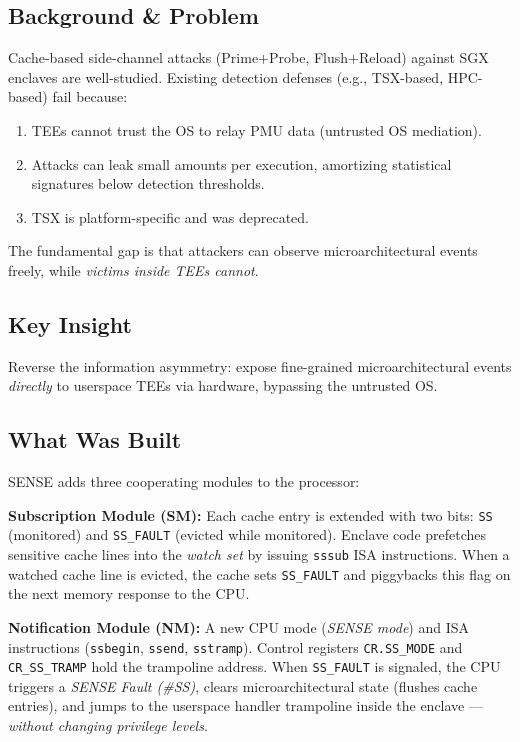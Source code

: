 \documentclass[11pt,letterpaper]{article}
\begin{document}
\subsection*{Background \& Problem}
Cache-based side-channel attacks (Prime+Probe, Flush+Reload) against SGX enclaves are well-studied.
Existing detection defenses (e.g., TSX-based, HPC-based) fail because:
\begin{enumerate}
    \item TEEs cannot trust the OS to relay PMU data (untrusted OS mediation).
    \item Attacks can leak small amounts per execution, amortizing statistical signatures below detection thresholds.
    \item TSX is platform-specific and was deprecated.
\end{enumerate}
The fundamental gap is that attackers can observe microarchitectural events freely, while \emph{victims inside TEEs cannot}.

\subsection*{Key Insight}
Reverse the information asymmetry: expose fine-grained microarchitectural events \emph{directly} to userspace TEEs via hardware, bypassing the untrusted OS.

\subsection*{What Was Built}
SENSE adds three cooperating modules to the processor:

\textbf{Subscription Module (SM):}
Each cache entry is extended with two bits: \texttt{SS} (monitored) and \texttt{SS\_FAULT} (evicted while monitored).
Enclave code prefetches sensitive cache lines into the \emph{watch set} by issuing \texttt{sssub} ISA instructions.
When a watched cache line is evicted, the cache sets \texttt{SS\_FAULT} and piggybacks this flag on the next memory response to the CPU.

\textbf{Notification Module (NM):}
A new CPU mode (\emph{SENSE mode}) and ISA instructions (\texttt{ssbegin}, \texttt{ssend}, \texttt{sstramp}).
Control registers \texttt{CR.SS\_MODE} and \texttt{CR\_SS\_TRAMP} hold the trampoline address.
When \texttt{SS\_FAULT} is signaled, the CPU triggers a \emph{SENSE Fault (\#SS)}, clears microarchitectural state (flushes cache entries), and jumps to the userspace handler trampoline inside the enclave — \emph{without changing privilege levels}.
\end{document}
